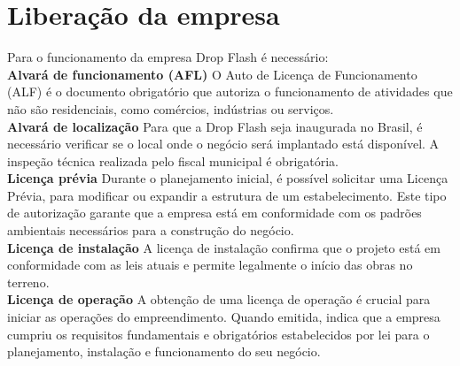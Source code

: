 \section{Liberação da empresa}

Para o funcionamento da empresa Drop Flash é necessário:\\

\textbf{Alvará de funcionamento (AFL)}
O Auto de Licença de Funcionamento (ALF) é o documento obrigatório que autoriza o funcionamento de atividades que não são residenciais, como comércios, indústrias ou serviços.\\

\textbf{Alvará de localização}
Para que a Drop Flash seja inaugurada no Brasil, é necessário verificar se o local onde o negócio será implantado está disponível. A inspeção técnica realizada pelo fiscal municipal é obrigatória.\\

\textbf{Licença prévia }
Durante o planejamento inicial, é possível solicitar uma Licença Prévia, para modificar ou expandir a estrutura de um estabelecimento. Este tipo de autorização garante que a empresa está em conformidade com os padrões ambientais necessários para a construção do negócio.\\

\textbf{Licença de instalação} 
A licença de instalação confirma que o projeto está em conformidade com as leis atuais e permite legalmente o início das obras no terreno.\\

\textbf{Licença de operação}
A obtenção de uma licença de operação é crucial para iniciar as operações do empreendimento. Quando emitida, indica que a empresa cumpriu os requisitos fundamentais e obrigatórios estabelecidos por lei para o planejamento, instalação e funcionamento do seu negócio.\\
